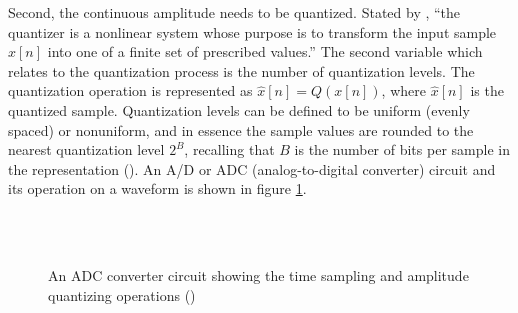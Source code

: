 \documentclass[report.tex]{subfiles}
\begin{document}
Second, the continuous amplitude needs to be quantized. Stated by \textcite[Chapter~4]{discretebook}, ``the quantizer is a nonlinear system whose purpose is to transform the input sample $x[n]$ into one of a finite set of prescribed values.'' The second variable which relates to the quantization process is the number of quantization levels. The quantization operation is represented as $ \hat{x}[n] = Q(x[n])$, where $\hat{x}[n]$ is the quantized sample. Quantization levels can be defined to be uniform (evenly spaced) or nonuniform, and in essence the sample values are rounded to the nearest quantization level $2^{B}$, recalling that $B$ is the number of bits per sample in the representation (\cite{discretebook}). An A/D or ADC (analog-to-digital converter) circuit and its operation on a waveform is shown in figure \ref{fig:adccircuit}.

\begin{figure}[ht]
	\centering
	\hspace{0.1em}
	\\
	\vspace{0.1em}
	\\
	\caption{An ADC converter circuit showing the time sampling and amplitude quantizing operations (\cite[Chapter~4]{discretebook})}
	\label{fig:adccircuit}
\end{figure}
\end{document}
